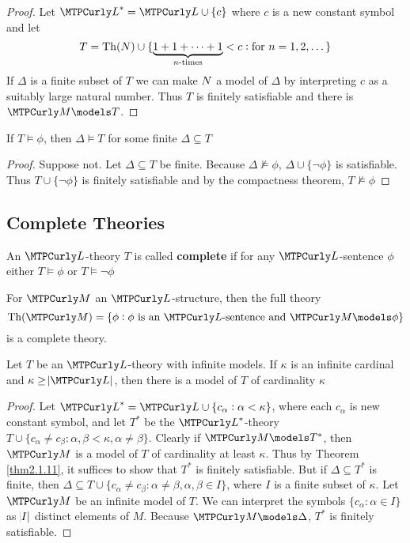 \documentclass[11pt]{article}
\begin{document}
\begin{proof}
Let \(\call^*=\call\cup\{c\}\) where \(c\) is a new constant symbol and let
\begin{equation*}
T=\operatorname{Th}(\relax{N})\cup\{\underbrace{1+1+\dots+1}_{n\text{-times}}<c:\text{for }n=1,2,\dots\} 
\end{equation*}
If \(\Delta\) is a finite subset of \(T\) we can make \(\relax{N}\) a model of \(\Delta\) by
interpreting \(c\) as a suitably large natural number. Thus \(T\) is finitely
satisfiable and there is \(\calm\models T\).
\end{proof}
\begin{lemma}[]
\label{lemma2.1.14}
If \(T\models\phi\), then \(\Delta\models T\) for some finite \(\Delta\subseteq T\)
\end{lemma}
\begin{proof}
Suppose not. Let \(\Delta\subseteq T\) be finite. Because
\(\Delta\not\models\phi\), \(\Delta\cup\{\neg\phi\}\) is satisfiable. Thus
\(T\cup\{\neg\phi\}\) is finitely satisfiable and by the compactness theorem,
\(T\not\models\phi\) 
\end{proof}



\subsection{Complete Theories}
\label{sec:org9be0831}
\begin{definition}[]
An \(\call\)-theory \(T\) is called \textbf{complete} if for any \(\call\)-sentence \(\phi\)
either \(T\models\phi\) or \(T\models\neg\phi\)
\end{definition}

For \(\calm\) an \(\call\)-structure, then the full theory
\begin{equation*}
\Th(\calm)=\{\phi:\phi\text{ is an }\call\text{-sentence and }
\calm\models\phi\}
\end{equation*}
is a complete theory.

\begin{proposition}[]
\label{prop2.2.2}
Let \(T\) be an \(\call\)-theory with infinite models. If \(\kappa\) is an infinite
cardinal and \(\kappa\ge\abs{\call}\), then there is a model of \(T\) of
cardinality \(\kappa\)
\end{proposition}

\begin{proof}
Let \(\call^*=\call\cup\{c_\alpha:\alpha<\kappa\}\), where each \(c_\alpha\) is
new constant symbol, and let \(T^*\) be the \(\call^*\)-theory
\(T\cup\{c_\alpha\neq c_\beta:\alpha,\beta<\kappa,\alpha\neq\beta\}\). Clearly
if \(\calm\models T^*\), then \(\calm\) is a model of \(T\) of cardinality at least
\(\kappa\).
Thus by Theorem \ref{thm2.1.11}, it suffices to show that \(T^*\) is finitely
satisfiable. But if \(\Delta\subseteq T^*\) is finite, then \(\Delta\subseteq
   T\cup\{c_\alpha\neq c_\beta:\alpha\neq\beta,\alpha,\beta\in I\}\), where \(I\)
is a finite subset of \(\kappa\). Let \(\calm\) be an infinite model of \(T\). We can
interpret the symbols \(\{c_\alpha:\alpha\in I\}\) as \(\abs{I}\) distinct
elements of \(M\). Because \(\calm\models\Delta\), \(T^*\) is finitely satisfiable.
\end{proof}
\end{document}
